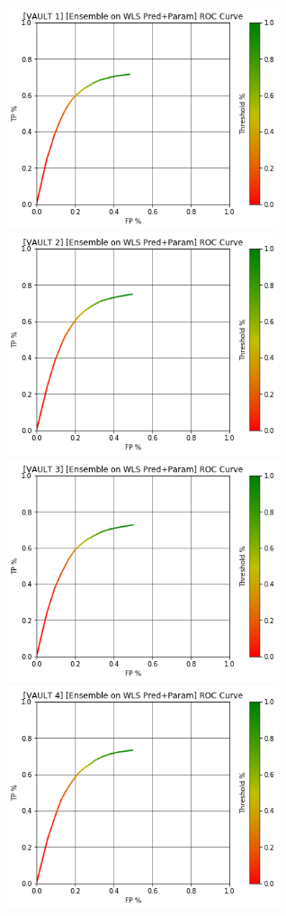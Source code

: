 \begin{figure}[h]
\centering
\includegraphics[width=8cm]{body/results/Graphs/JustSeries/2.PerformanceofEnsemble/2.LWS/Raw/v1.png}
\includegraphics[width=8cm]{body/results/Graphs/JustSeries/2.PerformanceofEnsemble/2.LWS/Raw/v2.png}
\includegraphics[width=8cm]{body/results/Graphs/JustSeries/2.PerformanceofEnsemble/2.LWS/Raw/v3.png}
\includegraphics[width=8cm]{body/results/Graphs/JustSeries/2.PerformanceofEnsemble/2.LWS/Raw/v4.png}

\end{figure}
